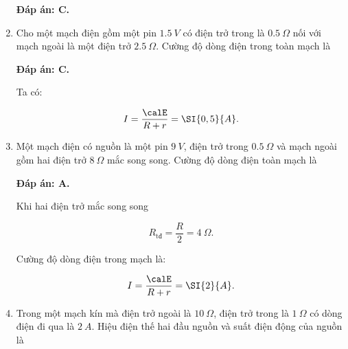 \begin{enumerate}[label=\bfseries Câu \arabic*:]
	\hideall
	{		\textbf{Đáp án: C.}
		
		
		
	}
	\item {}
	
	
	{Cho một mạch điện gồm một pin $\SI{1,5}{V}$ có điện trở trong là $\SI{0,5}{\Omega}$ nối với mạch ngoài là một điện trở $\SI{2,5}{\Omega}$. Cường độ dòng điện trong toàn mạch là
	}
	
	\hideall
	{		\textbf{Đáp án: C.}
		
		Ta có: 
		
		$$I = \dfrac{\calE}{R+r} = \SI{0,5}{A}.$$ 
		
	}
	\item {}
	
	
	{Một mạch điện có nguồn là một pin $\SI{9}{V}$, điện trở trong $\SI{0,5}{\Omega}$ và mạch ngoài gồm hai điện trở $\SI{8}{\Omega}$ mắc song song. Cường độ dòng điện toàn mạch là
	}
	
	\hideall
	{		\textbf{Đáp án: A.}
		
		Khi hai điện trở mắc song song
		
		$$R_\text{tđ} = \dfrac{R}{2} = \SI{4}{\Omega}.$$
		
		Cường độ dòng điện trong mạch là:
		
		$$I = \dfrac{\calE}{R+r} = \SI{2}{A}.$$ 
		
	}
	\item {}
	
	
	{Trong một mạch kín mà điện trở ngoài là $\SI{10}{\Omega}$, điện trở trong là $\SI{1}{\Omega}$ có dòng điện đi qua là $\SI{2}{A}$. Hiệu điện thế hai đầu nguồn và suất điện động của nguồn là
	}
	

\end{enumerate}
